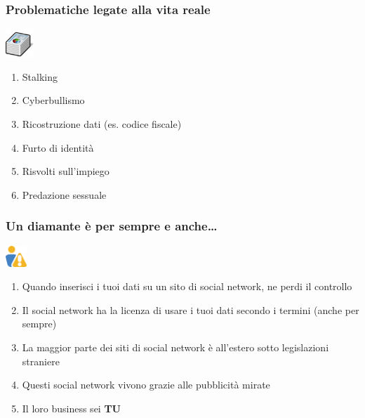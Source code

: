 \documentclass[xcolor=svgnames]{beamer}
\begin{document}
\begin{frame}
	\frametitle{Problematiche legate alla vita reale}

	\begin{block}{\includegraphics[width=40px]{img/data.png}}
			\begin{enumerate}
					\item Stalking
						\pause
					\item Cyberbullismo
						\pause
					\item Ricostruzione dati (es. codice fiscale)
						\pause
					\item Furto di identità
						\pause
					\item Risvolti sull'impiego
						\pause
					\item Predazione sessuale
			\end{enumerate}
	\end{block}
\end{frame}

\begin{frame}
	\frametitle{Un diamante è per sempre e anche\ldots}

	\begin{block}{\includegraphics[width=30px]{img/warning.png}}
			\begin{enumerate}
					\item Quando inserisci i tuoi dati su un sito di social network, ne perdi il controllo
						\pause
					\item Il social network ha la licenza di usare i tuoi dati secondo i termini (anche per sempre)
						\pause
					\item La maggior parte dei siti di social network è all'estero sotto legislazioni straniere
						\pause
					\item Questi social network vivono grazie alle pubblicità mirate
						\pause
					\item Il loro business sei {\bf TU}
			\end{enumerate}
	\end{block}
\end{frame}
\end{document}
